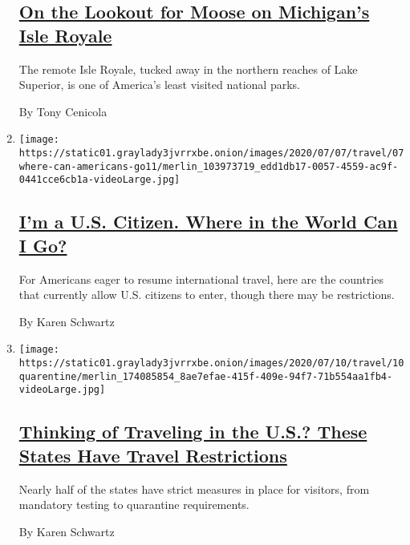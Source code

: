 \begin{enumerate}
  \hypertarget{on-the-lookout-for-moose-on-michigans-isle-royale}{%
  \subsection{\texorpdfstring{\href{/2020/07/27/travel/moose-michigan-isle-royale.html}{On
  the Lookout for Moose on Michigan's Isle
  Royale}}{On the Lookout for Moose on Michigan's Isle Royale}}\label{on-the-lookout-for-moose-on-michigans-isle-royale}}

  The remote Isle Royale, tucked away in the northern reaches of Lake
  Superior, is one of America's least visited national parks.

  By Tony Cenicola
\item
  \texttt{[image: https://static01.graylady3jvrrxbe.onion/images/2020/07/07/travel/07where-can-americans-go11/merlin\_103973719\_edd1db17-0057-4559-ac9f-0441cce6cb1a-videoLarge.jpg]}

  \hypertarget{im-a-us-citizen-where-in-the-world-can-i-go}{%
  \subsection{\texorpdfstring{\href{/2020/07/07/travel/american-travelers-restrictions-coronavirus.html}{I'm
  a U.S. Citizen. Where in the World Can I
  Go?}}{I'm a U.S. Citizen. Where in the World Can I Go?}}\label{im-a-us-citizen-where-in-the-world-can-i-go}}

  For Americans eager to resume international travel, here are the
  countries that currently allow U.S. citizens to enter, though there
  may be restrictions.

  By Karen Schwartz
\item
  \texttt{[image: https://static01.graylady3jvrrxbe.onion/images/2020/07/10/travel/10quarentine/merlin\_174085854\_8ae7efae-415f-409e-94f7-71b554aa1fb4-videoLarge.jpg]}

  \hypertarget{thinking-of-traveling-in-the-us-these-states-have-travel-restrictions}{%
  \subsection{\texorpdfstring{\href{/2020/07/10/travel/state-travel-restrictions.html}{Thinking
  of Traveling in the U.S.? These States Have Travel
  Restrictions}}{Thinking of Traveling in the U.S.? These States Have Travel Restrictions}}\label{thinking-of-traveling-in-the-us-these-states-have-travel-restrictions}}

  Nearly half of the states have strict measures in place for visitors,
  from mandatory testing to quarantine requirements.

  By Karen Schwartz
\end{enumerate}

